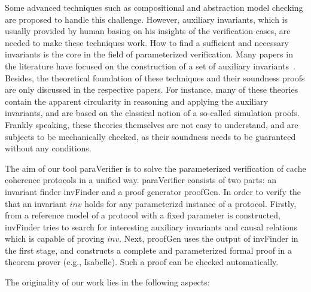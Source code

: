 Some advanced techniques such as compositional and abstraction model
checking are proposed to handle this challenge. However, auxiliary
invariants, which is usually provided by  human basing on his
insights of the verification cases, are needed to make these
techniques work. How to find a sufficient and necessary invariants
is the core in the field of parameterized verification.
Many papers in the literature have focused on the
construction of a set of auxiliary
invariants~\cite{Pnueli2001,Chou2004,Pandav2005,cubicle2011}.
Besides, the theoretical foundation of these techniques and their
soundness proofs are only discussed in the respective papers.
For instance, many of these theories contain the apparent circularity in reasoning and
applying the auxiliary invariants, and are based on the classical
notion of a so-called simulation proofs. Frankly speaking, these
theories themselves are not easy to understand, and are subjects
to be mechanically checked, as their soundness needs to be
guaranteed without any conditions.

The aim of our tool {\sf paraVerifier} is to solve the parameterized
verification of cache coherence protocols in a unified way. {\sf
paraVerifier} consists of two parts:  an invariant finder {\sf invFinder}
and a proof generator {\sf proofGen}. In order to verify the that an
invariant $inv$ holds for any parameterizd instance of a protocol.
Firstly,  from a reference model of a protocol with a fixed parameter
is constructed, {\sf invFinder} tries to search for
interesting auxiliary invariants and causal relations which is
capable of proving $inv$. Next, {\sf proofGen}
 uses the output of {\sf invFinder} in the first stage, and
 constructs a complete and parameterized
formal proof in a theorem prover (e.g., Isabelle). Such a proof can
be checked automatically.

The originality of our work lies in the following aspects:

